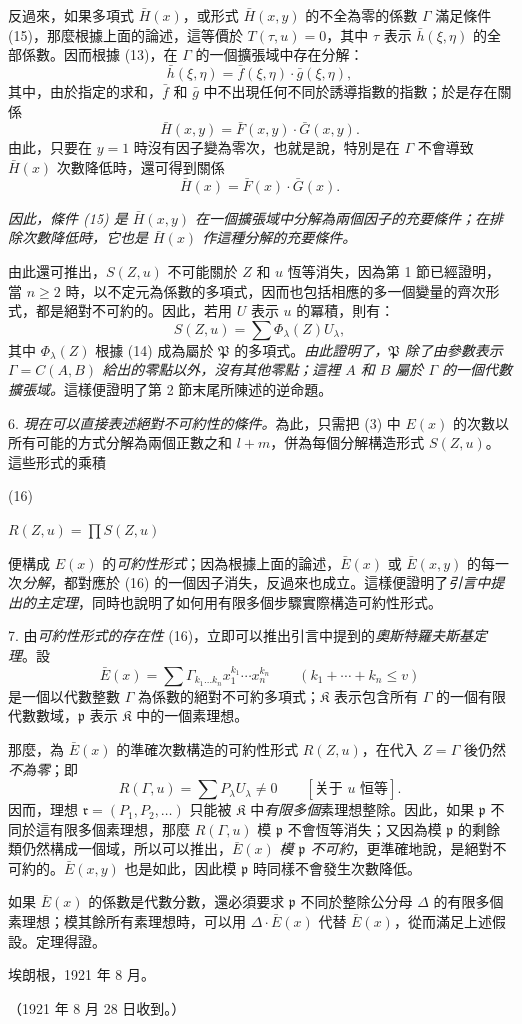 \documentclass[11pt]{article}
\providecommand{\frK}{\mathfrak K}
\providecommand{\srcnumdisplay}[3][3.4em]{%
  \par\smallskip\noindent
  \begin{minipage}[t]{#1}\vspace*{0pt}#2\end{minipage}%
  \begin{minipage}[t]{\dimexpr\linewidth-#1\relax}\vspace*{0pt}\centering
  \(\displaystyle #3\)
  \end{minipage}\par\smallskip}
\begin{document}
反過來，如果多項式 $\bar H(x)$，或形式 $\bar H(x,y)$ 的不全為零的係數 $\Gamma$ 滿足條件 (15)，那麼根據上面的論述，這等價於 $T(\tau,u)=0$，其中 $\tau$ 表示 $\bar h(\xi,\eta)$ 的全部係數。因而根據 (13)，在 $\Gamma$ 的一個擴張域中存在分解：
\[
 \bar h(\xi,\eta)=\bar f(\xi,\eta)\cdot\bar g(\xi,\eta),
\]
其中，由於指定的求和，$\bar f$ 和 $\bar g$ 中不出現任何不同於誘導指數的指數；於是存在關係
\[
 \bar H(x,y)=\bar F(x,y)\cdot\bar G(x,y).
\]
由此，只要在 $y=1$ 時沒有因子變為零次，也就是說，特別是在 $\Gamma$ 不會導致 $\bar H(x)$ 次數降低時，還可得到關係
\[
 \bar H(x)=\bar F(x)\cdot\bar G(x).
\]

\emph{因此，條件 (15) 是 $\bar H(x,y)$ 在一個擴張域中分解為兩個因子的充要條件；在排除次數降低時，它也是 $\bar H(x)$ 作這種分解的充要條件。}

由此還可推出，$S(Z,u)$ 不可能關於 $Z$ 和 $u$ 恆等消失，因為第 1 節已經證明，當 $n\ge2$ 時，以不定元為係數的多項式，因而也包括相應的多一個變量的齊次形式，都是絕對不可約的。因此，若用 $U$ 表示 $u$ 的冪積，則有：
\[
S(Z,u)=\sum \Phi_\lambda(Z)U_\lambda,
\]
其中 $\Phi_\lambda(Z)$ 根據 (14) 成為屬於 $\mathfrak P$ 的多項式。\emph{由此證明了，$\mathfrak P$ 除了由參數表示 $\Gamma=C(A,B)$ 給出的零點以外，沒有其他零點；這裡 $A$ 和 $B$ 屬於 $\Gamma$ 的一個代數擴張域。}這樣便證明了第 2 節末尾所陳述的逆命題。

6. \emph{現在可以直接表述絕對不可約性的條件。}為此，只需把 (3) 中 $E(x)$ 的次數以所有可能的方式分解為兩個正數之和 $l+m$，併為每個分解構造形式 $S(Z,u)$。這些形式的乘積
\srcnumdisplay{(16)}{%
R(Z,u)=\prod S(Z,u)
}
便構成 $E(x)$ 的\emph{可約性形式}；因為根據上面的論述，$\bar E(x)$ 或 $\bar E(x,y)$ 的每一次\emph{分解}，都對應於 (16) 的一個因子消失，反過來也成立。這樣便證明了\emph{引言中提出的主定理}，同時也說明了如何用有限多個步驟實際構造可約性形式。

7. 由\emph{可約性形式的存在性} (16)，立即可以推出引言中提到的\emph{奧斯特羅夫斯基定理}。設
\[
 \bar E(x)=\sum \Gamma_{k_1\ldots k_n}x_1^{k_1}\cdots x_n^{k_n}
 \qquad(k_1+\cdots+k_n\le v)
\]
是一個以代數整數 $\Gamma$ 為係數的絕對不可約多項式；$\frK$ 表示包含所有 $\Gamma$ 的一個有限代數數域，$\mathfrak p$ 表示 $\frK$ 中的一個素理想。

那麼，為 $\bar E(x)$ 的準確次數構造的可約性形式 $R(Z,u)$，在代入 $Z=\Gamma$ 後仍然\emph{不為零}；即
\[
 R(\Gamma,u)=\sum P_\lambda U_\lambda\ne0\qquad[\text{关于 }u\text{ 恒等}].
\]
因而，理想 $\mathfrak r=(P_1,P_2,\ldots)$ 只能被 $\frK$ 中\emph{有限多個}素理想整除。因此，如果 $\mathfrak p$ 不同於這有限多個素理想，那麼 $R(\Gamma,u)$ 模 $\mathfrak p$ 不會恆等消失；又因為模 $\mathfrak p$ 的剩餘類仍然構成一個域，所以可以推出，$\bar E(x)$ \emph{模 $\mathfrak p$ 不可約}，更準確地說，是絕對不可約的。$\bar E(x,y)$ 也是如此，因此模 $\mathfrak p$ 時同樣不會發生次數降低。

如果 $\bar E(x)$ 的係數是代數分數，還必須要求 $\mathfrak p$ 不同於整除公分母 $\Delta$ 的有限多個素理想；模其餘所有素理想時，可以用 $\Delta\cdot\bar E(x)$ 代替 $\bar E(x)$，從而滿足上述假設。定理得證。

\begin{flushleft}
埃朗根，1921 年 8 月。
\end{flushleft}
\begin{center}
（1921 年 8 月 28 日收到。）
\end{center}

\clearpage
\end{document}
